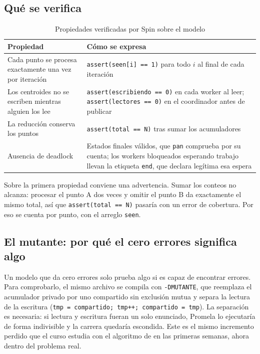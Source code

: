 \subsection{Qué se verifica}

\begin{table}[H]
\caption{Propiedades verificadas por Spin sobre el modelo}\label{tab:propiedades}
\small
\begin{tabularx}{\textwidth}{@{}L{5.6cm}Y@{}}
\toprule
\textbf{Propiedad} & \textbf{Cómo se expresa} \\
\midrule
Cada punto se procesa exactamente una vez por iteración
  & \texttt{assert(seen[i] == 1)} para todo $i$ al final de cada iteración \\
\addlinespace
Los centroides no se escriben mientras alguien los lee
  & \texttt{assert(escribiendo == 0)} en cada worker al leer; \texttt{assert(lectores == 0)} en el
    coordinador antes de publicar \\
\addlinespace
La reducción conserva los puntos & \texttt{assert(total == N)} tras sumar los acumuladores \\
\addlinespace
Ausencia de deadlock & Estados finales válidos, que \texttt{pan} comprueba por su cuenta; los
  workers bloqueados esperando trabajo llevan la etiqueta \texttt{end}, que declara legítima esa
  espera \\
\bottomrule
\end{tabularx}
\end{table}

Sobre la primera propiedad conviene una advertencia. Sumar los conteos no alcanza: procesar el
punto A dos veces y omitir el punto B da exactamente el mismo total, así que
\texttt{assert(total == N)} pasaría con un error de cobertura. Por eso se cuenta por punto, con el
arreglo \texttt{seen}.

\subsection{El mutante: por qué el cero errores significa algo}

Un modelo que da cero errores solo prueba algo si es capaz de encontrar errores. Para comprobarlo,
el mismo archivo se compila con \texttt{-DMUTANTE}, que reemplaza el acumulador privado por uno
compartido sin exclusión mutua y separa la lectura de la escritura
(\texttt{tmp = compartido; tmp++; compartido = tmp}). La separación es necesaria: si lectura y
escritura fueran un solo enunciado, Promela lo ejecutaría de forma indivisible y la carrera quedaría
escondida. Este es el mismo incremento perdido que el curso estudia con el algoritmo de
\textcite{benari2006} en las primeras semanas, ahora dentro del problema real.

